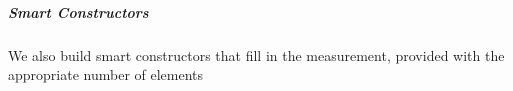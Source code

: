 \documentclass[12pt,twoside,notitlepage]{report}
\begin{document}
\subparagraph{Smart Constructors}
We also build smart constructors that fill in the measurement, provided with the appropriate number of elements

\begin{code}
\\
\> \AgdaSymbol{:}  \AgdaSymbol{\{}\AgdaSymbol{\}} \AgdaSymbol{\{} \AgdaSymbol{:}  \AgdaSymbol{\}\{} \AgdaSymbol{:}   \AgdaSymbol{\}}\<%
\\
\>[0]\<[8]%
\>[8]  \AgdaSymbol{:}   \<%
\\
\>[0]\<[8]%
\>[8]  \AgdaSymbol{:}    \<%
\\
\>[0]\<[8]%
\>[8]       \<%
\\
\>   \AgdaSymbol{=}  \AgdaSymbol{(}      \AgdaSymbol{)}   \<%
\\
%
\\
\> \AgdaSymbol{:}  \AgdaSymbol{\{}\AgdaSymbol{\}} \AgdaSymbol{\{} \AgdaSymbol{:}  \AgdaSymbol{\}\{} \AgdaSymbol{:}   \AgdaSymbol{\}}\<%
\\
\>[0]\<[8]%
\>[8]  \AgdaSymbol{:}   \<%
\\
\>[0]\<[8]%
\>[8]  \AgdaSymbol{:}    \<%
\\
\>[0]\<[8]%
\>[8]         \<%
\\
\>    \AgdaSymbol{=}  \AgdaSymbol{(}          \AgdaSymbol{)}    \<%
\\
\end{code}
\end{document}
